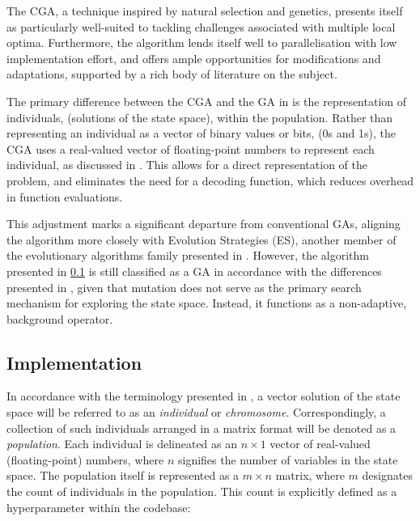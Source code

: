 \documentclass[10pt]{article}
\begin{document}
\begin{multicols}{2}
The CGA, a technique inspired by natural selection and genetics, presents itself as particularly well-suited to tackling challenges associated with multiple local optima. Furthermore, the algorithm lends itself well to parallelisation with low implementation effort, and offers ample opportunities for modifications and adaptations, supported by a rich body of literature on the subject.

The primary difference between the CGA and the GA in \cite{parks2023geneticalgorithms} is the representation of individuals, (solutions of the state space), within the population. Rather than representing an individual as a vector of binary values or bits, (0s and 1s), the CGA uses a real-valued vector of floating-point numbers to represent each individual, as discussed in \cite{PGA}. This allows for a direct representation of the problem, and eliminates the need for a decoding function, which reduces overhead in function evaluations.

This adjustment marks a significant departure from conventional GAs, aligning the algorithm more closely with Evolution Strategies (ES), another member of the evolutionary algorithms family presented in \cite{salimans2017evolution}. However, the algorithm presented in \ref{sec:CGA_implementation} is still classified as a GA in accordance with the differences presented in \cite{10.1007/BFb0029787}, given that mutation does not serve as the primary search mechanism for exploring the state space. Instead, it functions as a non-adaptive, background operator.

\subsection{Implementation}
\label{sec:CGA_implementation}

In accordance with the terminology presented in \cite{parks2023geneticalgorithms}, a vector solution of the state space will be referred to as an \textit{individual} or \textit{chromosome}. Correspondingly, a collection of such individuals arranged in a matrix format will be denoted as a \textit{population}. Each individual is delineated as an $n \times 1$ vector of real-valued (floating-point) numbers, where $n$ signifies the number of variables in the state space. The population itself is represented as a $m \times n$ matrix, where $m$ designates the count of individuals in the population. This count is explicitly defined as a hyperparameter within the codebase: %


\end{multicols}
\end{document}
